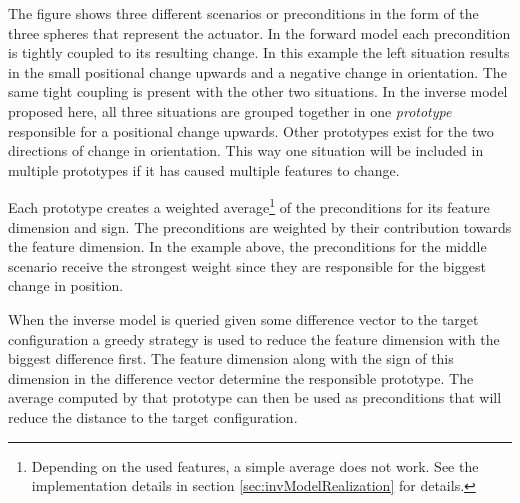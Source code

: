 The figure shows three different scenarios or preconditions in the form of the three spheres that represent the actuator. In the forward model each precondition is tightly coupled to its resulting change. In this example the left situation results in the small positional change upwards and a negative change in orientation. The same tight coupling is present with the other two situations. In the inverse model proposed here, all three situations are grouped together in one \textit{prototype} responsible for a positional change upwards. Other prototypes exist for the two directions of change in orientation. This way one situation will be included in multiple prototypes if it has caused multiple features to change.

Each prototype creates a weighted average\footnote{Depending on the used features, a simple average does not work. See the implementation details in section \ref{sec:invModelRealization} for details.} of the preconditions for its feature dimension and sign. The preconditions are weighted by their contribution towards the feature dimension. In the example above, the preconditions for the middle scenario receive the strongest weight since they are responsible for the biggest change in position. 

When the inverse model is queried given some difference vector to the target configuration a greedy strategy is used to reduce the feature dimension with the biggest difference first. 
The feature dimension along with the sign of this dimension in the difference vector determine the responsible prototype. The average computed by that prototype can then be used as preconditions that will reduce the distance to the target configuration.



	
